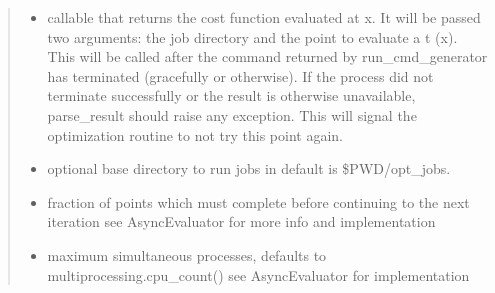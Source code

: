 \documentclass[letterpaper,12pt,english]{sphinxmanual}
\begin{document}
\begin{fulllineitems}
\begin{quote}
\begin{description}
\begin{itemize}
\item {} 
\sphinxAtStartPar
{} \textendash{} callable that returns the cost function evaluated at x.     It will be passed two arguments: the job directory and the point to evaluate a t (x).    This will be called after the command returned by run\_cmd\_generator has terminated (gracefully or otherwise).     If the process did not terminate successfully or the result is otherwise unavailable, parse\_result     should raise any exception. This will signal the optimization routine to not try this point again.

\item {} 
\sphinxAtStartPar
{} \textendash{} optional base directory to run jobs in \sphinxhyphen{} default is \$PWD/opt\_jobs.

\item {} 
\sphinxAtStartPar
{} \textendash{} fraction of points which must complete before continuing to the next iteration see     AsyncEvaluator for more info and implementation

\item {} 
\sphinxAtStartPar
{} \textendash{} maximum simultaneous processes, defaults to multiprocessing.cpu\_count() see AsyncEvaluator for     implementation

\end{itemize}

\end{description}\end{quote}


\end{fulllineitems}
\end{document}
